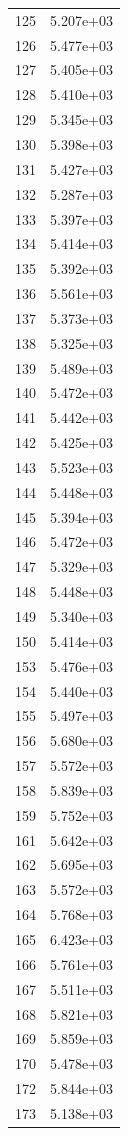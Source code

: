 \documentclass[12pt]{article}
\begin{document}
\begin{longtable}{@{}cc@{}}
125 & 5.207e+03 \\
126 & 5.477e+03 \\
127 & 5.405e+03 \\
128 & 5.410e+03 \\
129 & 5.345e+03 \\
130 & 5.398e+03 \\
131 & 5.427e+03 \\
132 & 5.287e+03 \\
133 & 5.397e+03 \\
134 & 5.414e+03 \\
135 & 5.392e+03 \\
136 & 5.561e+03 \\
137 & 5.373e+03 \\
138 & 5.325e+03 \\
139 & 5.489e+03 \\
140 & 5.472e+03 \\
141 & 5.442e+03 \\
142 & 5.425e+03 \\
143 & 5.523e+03 \\
144 & 5.448e+03 \\
145 & 5.394e+03 \\
146 & 5.472e+03 \\
147 & 5.329e+03 \\
148 & 5.448e+03 \\
149 & 5.340e+03 \\
150 & 5.414e+03 \\
153 & 5.476e+03 \\
154 & 5.440e+03 \\
155 & 5.497e+03 \\
156 & 5.680e+03 \\
157 & 5.572e+03 \\
158 & 5.839e+03 \\
159 & 5.752e+03 \\
161 & 5.642e+03 \\
162 & 5.695e+03 \\
163 & 5.572e+03 \\
164 & 5.768e+03 \\
165 & 6.423e+03 \\
166 & 5.761e+03 \\
167 & 5.511e+03 \\
168 & 5.821e+03 \\
169 & 5.859e+03 \\
170 & 5.478e+03 \\
172 & 5.844e+03 \\
173 & 5.138e+03 \\

\end{longtable}
\end{document}

